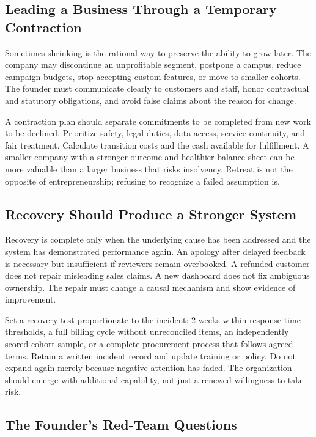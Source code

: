 \subsection{Leading a Business Through a Temporary Contraction}
\label{sec:temporary_contraction}

Sometimes shrinking is the rational way to preserve the ability to grow later. The company may discontinue an unprofitable segment, postpone a campus, reduce campaign budgets, stop accepting custom features, or move to smaller cohorts. The founder must communicate clearly to customers and staff, honor contractual and statutory obligations, and avoid false claims about the reason for change.

A contraction plan should separate commitments to be completed from new work to be declined. Prioritize safety, legal duties, data access, service continuity, and fair treatment. Calculate transition costs and the cash available for fulfillment. A smaller company with a stronger outcome and healthier balance sheet can be more valuable than a larger business that risks insolvency. Retreat is not the opposite of entrepreneurship; refusing to recognize a failed assumption is.

\subsection{Recovery Should Produce a Stronger System}
\label{sec:recovery_stronger_system}

Recovery is complete only when the underlying cause has been addressed and the system has demonstrated performance again. An apology after delayed feedback is necessary but insufficient if reviewers remain overbooked. A refunded customer does not repair misleading sales claims. A new dashboard does not fix ambiguous ownership. The repair must change a causal mechanism and show evidence of improvement.

Set a recovery test proportionate to the incident: 2 weeks within response-time thresholds, a full billing cycle without unreconciled items, an independently scored cohort sample, or a complete procurement process that follows agreed terms. Retain a written incident record and update training or policy. Do not expand again merely because negative attention has faded. The organization should emerge with additional capability, not just a renewed willingness to take risk.

\subsection{The Founder's Red-Team Questions}
\label{sec:founders_red_team_questions}

